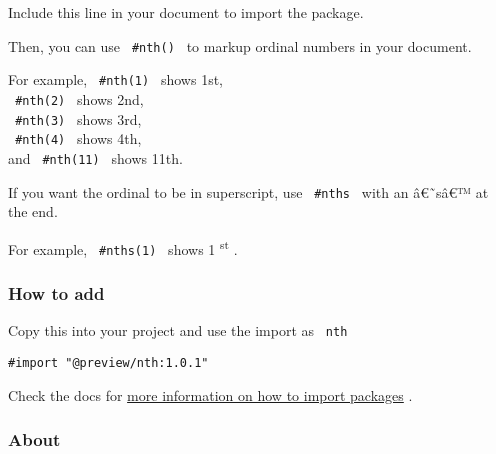 Include this line in your document to import the package.

\begin{Shaded}
\begin{Highlighting}[]
\end{Highlighting}
\end{Shaded}

Then, you can use \texttt{\ \#nth()\ } to markup ordinal numbers in your
document.

For example, \texttt{\ \#nth(1)\ } shows 1st,\\
\texttt{\ \#nth(2)\ } shows 2nd,\\
\texttt{\ \#nth(3)\ } shows 3rd,\\
\texttt{\ \#nth(4)\ } shows 4th,\\
and \texttt{\ \#nth(11)\ } shows 11th.

If you want the ordinal to be in superscript, use \texttt{\ \#nths\ }
with an â€˜sâ€™ at the end.

For example, \texttt{\ \#nths(1)\ } shows 1 \textsuperscript{st} .

\subsubsection{How to add}\label{how-to-add}

Copy this into your project and use the import as \texttt{\ nth\ }

\begin{verbatim}
#import "@preview/nth:1.0.1"
\end{verbatim}



Check the docs for
\href{https://typst.app/docs/reference/scripting/\#packages}{more
information on how to import packages} .

\subsubsection{About}\label{about}


